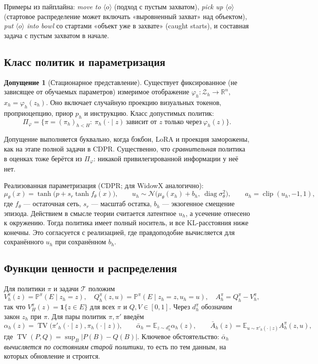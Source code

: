 \documentclass[11pt,a4paper]{article}
\theoremstyle{plain}
\theoremstyle{definition}
\newtheorem{assumption}[theorem]{Допущение}
\theoremstyle{remark}
\newcommand{\E}{\mathbb{E}}
\newcommand{\PP}{\mathbb{P}}
\newcommand{\R}{\mathbb{R}}
\DeclareMathOperator{\TV}{TV}
\DeclareMathOperator{\clip}{clip}
\newcommand{\cT}{\mathcal{T}}
\newcommand{\cZ}{\mathcal{Z}}
\newcommand{\ab}{\bar\alpha}
\newcommand{\one}{\mathbf 1}
\begin{document}
Примеры из пайплайна: \emph{move to $\langle o\rangle$} (подход с пустым захватом), \emph{pick up $\langle o\rangle$} (стартовое распределение может включать «выровненный захват» над объектом), \emph{put $\langle o\rangle$ into bowl} со стартами «объект уже в захвате» (caught starts), и составная задача с пустым захватом в начале.

\subsection{Класс политик и параметризация}\label{sec:policy-class}
\begin{assumption}[Стационарное представление]\label{ass:features}
Существует фиксированное (не зависящее от обучаемых параметров) измеримое отображение $\varphi_h:\cZ_h\to\R^n$, $x_h=\varphi_h(z_h)$. Оно включает случайную проекцию визуальных токенов, проприоцепцию, приор $p_h$ и инструкцию. Класс допустимых политик:
\[
\Pi_\varphi=\bigl\{\pi=(\pi_h)_{h<H}:\ \pi_h(\cdot\mid z)\ \text{зависит от $z$ только через}\ \varphi_h(z)\bigr\}.
\]
\end{assumption}

Допущение выполняется буквально, когда бэкбон, LoRA и проекция заморожены, как на этапе полной задачи в CDPR. Существенно, что \emph{сравнительная} политика в оценках тоже берётся из $\Pi_\varphi$: никакой привилегированной информации у неё нет.

Реализованная параметризация (CDPR; для WidowX аналогично):
\begin{equation}\label{eq:param}
\mu_\theta(x)=\tanh\bigl(p+s_r\tanh f_\theta(x)\bigr),\qquad
u_h\sim\mathcal N\bigl(\mu_\theta(x_h)+b_h,\ \operatorname{diag}\sigma_\theta^2\bigr),\qquad
a_h=\clip(u_h,-1,1),
\end{equation}
где $f_\theta$ --- остаточная сеть, $s_r$ --- масштаб остатка, $b_h$ --- экзогенное смещение эпизода. Действием в смысле теории считается латентное $u_h$, а усечение отнесено к окружению. Тогда политика имеет полный носитель, и все KL-расстояния ниже конечны. Это согласуется с реализацией, где правдоподобие вычисляется для сохранённого $u_h$ при сохранённом $b_h$.

\subsection{Функции ценности и распределения}
Для политики $\pi$ и задачи $\cT$ положим
\[
V^\pi_h(z)=\PP^\pi(E\mid z_h=z),\quad Q^\pi_h(z,u)=\PP^\pi(E\mid z_h=z,u_h=u),\quad A^\pi_h=Q^\pi_h-V^\pi_h,
\]
так что $V^\pi_H(z)=\one\{z\in E\}$ для всех $\pi$ и $Q,V\in[0,1]$. Через $d^\pi_h$ обозначим закон $z_h$ при $\pi$. Для пары политик $\pi,\pi'$ введём
\[
\alpha_h(z)=\TV\bigl(\pi'_h(\cdot\mid z),\pi_h(\cdot\mid z)\bigr),\qquad
\ab_h=\E_{z\sim d^\pi_h}\alpha_h(z),\qquad
\bar A_h(z)=\E_{u\sim\pi'_h(\cdot\mid z)}A^\pi_h(z,u),
\]
где $\TV(P,Q)=\sup_B|P(B)-Q(B)|$. Ключевое обстоятельство: \emph{$\ab_h$ вычисляется по состояниям старой политики}, то есть по тем данным, на которых обновление и строится.
\end{document}

